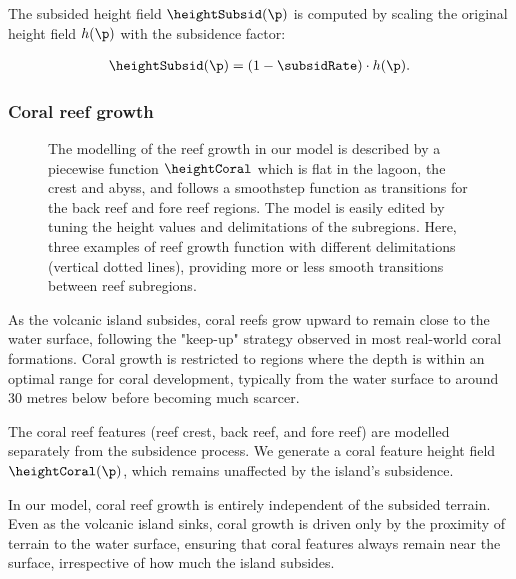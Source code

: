 The subsided height field $\heightSubsid(\p)$ is computed by scaling the original height field $h(\p)$ with the subsidence factor:

\begin{align*}
    \heightSubsid(\p) = (1 - \subsidRate) \cdot h(\p).
\end{align*}

\subsubsection{Coral reef growth}
\label{sec:coral-island-reef-growth}

\begin{figure}
    \caption[Coral reef growth from analytical model]{The modelling of the reef growth in our model is described by a piecewise function $\heightCoral$ which is flat in the lagoon, the crest and abyss, and follows a smoothstep function as transitions for the back reef and fore reef regions. The model is easily edited by tuning the height values and delimitations of the subregions. Here, three examples of reef growth function with different delimitations (vertical dotted lines), providing more or less smooth transitions between reef subregions.}
    \label{fig:coral-island-reef-function}
\end{figure}

As the volcanic island subsides, coral reefs grow upward to remain close to the water surface, following the "keep-up" strategy observed in most real-world coral formations. Coral growth is restricted to regions where the depth is within an optimal range for coral development, typically from the water surface to around 30 metres below before becoming much scarcer.

The coral reef features (reef crest, back reef, and fore reef) are modelled separately from the subsidence process. We generate a coral feature height field $\heightCoral(\p)$, which remains unaffected by the island's subsidence. %

In our model, coral reef growth is entirely independent of the subsided terrain. Even as the volcanic island sinks, coral growth is driven only by the proximity of terrain to the water surface, ensuring that coral features always remain near the surface, irrespective of how much the island subsides.

